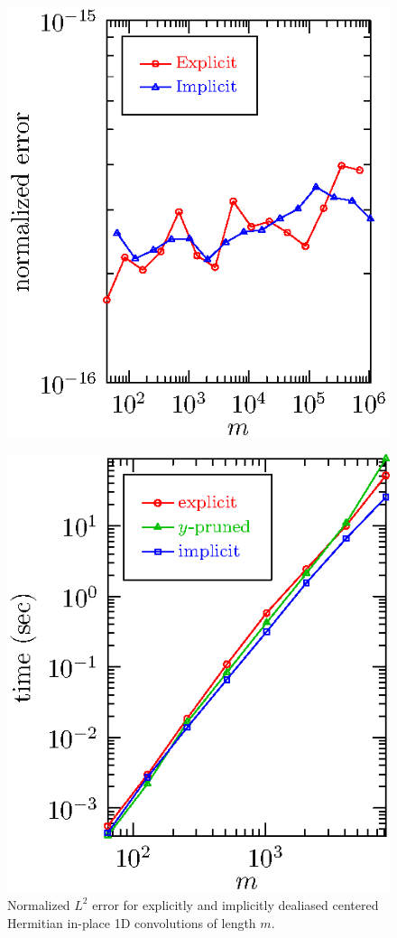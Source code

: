 \documentclass[final]{siamltex}
\begin{document}
\begin{figure}[htbp]
\begin{minipage}{0.5\linewidth}
\begin{center}
\includegraphics{error1r}
\caption{Normalized $L^2$ error for explicitly and implicitly
dealiased centered Hermitian in-place 1D convolutions of length $m$.}
\label{error1r}
\end{center}
\end{minipage}
%
\begin{minipage}{0.5\linewidth}
\begin{center}
\includegraphics{timing2c}

\end{center}
\end{minipage}
\end{figure}
\end{document}
